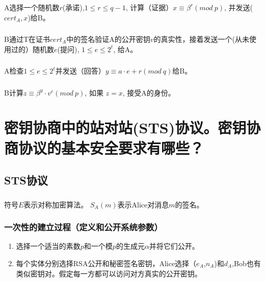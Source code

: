 \documentclass[11pt,a4paper]{article}
\begin{document}
\subsubsection{}A选择一个随机数$r$(承诺),$1\le r \le q-1$, 计算（证据）$x\equiv \beta^r(mod\ p)$, 并发送($cert_A, x$)给B。
\subsubsection{}B通过T在证书$cert_A$中的签名验证A的公开密钥$v$的真实性，接着发送一个(从未使用过的）随机数$e$(提问), $1 \le e \le 2^t$, 给A。
\subsubsection{}A检查$1\le e \le2^t$并发送（回答）$y\equiv a·e+r(mod\ q)$给B。
\subsubsection{}B计算$z\equiv \beta^y·v^e(mod\ p)$, 如果 $z=x$, 接受A的身份。
\section{密钥协商中的站对站(STS)协议。密钥协商协议的基本安全要求有哪些？}

\subsection{STS协议}
\subsubsection{}符号$E$表示对称加密算法。 $S_A(m)$表示Alice对消息$m$的签名。
\subsubsection{一次性的建立过程（定义和公开系统参数）}
\begin{enumerate}
\item 选择一个适当的素数$p$和一个模$p$的生成元$\alpha$并将它们公开。
\item 每个实体分别选择RSA公开和秘密签名密钥，Alice选择（$e_A$,$n_A$)和$d_A$,Bob也有类似密钥对。假定每一方都可以访问对方真实的公开密钥。
\end{enumerate}
\end{document}
